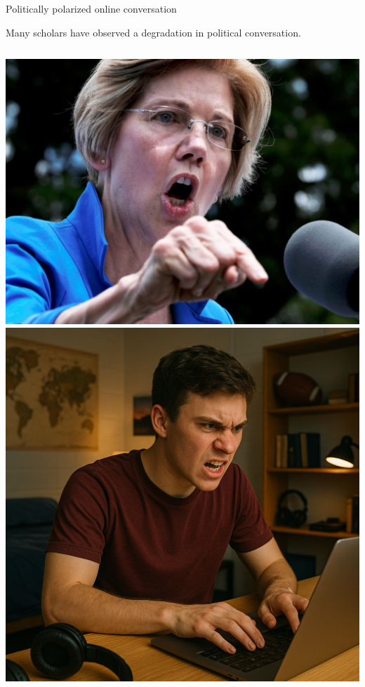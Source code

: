 \documentclass[12pt]{beamer}
\begin{document}
\begin{frame}[c]{Politically polarized online conversation}
\small
\begin{center}
Many scholars have observed a degradation in political conversation.
\end{center}

\begin{columns}[c,onlytextwidth]
  \begin{column}{0.2\textwidth}
    \centering
    \includegraphics[width=\linewidth]{warren.jpg}\\
    \bigskip
    \includegraphics[width=\linewidth]{angryGuy.png}
  \end{column}


\end{columns}
\end{frame}
\end{document}
